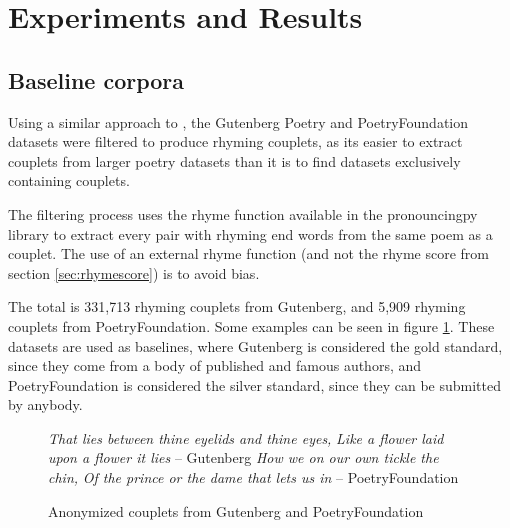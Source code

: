 \documentclass[11pt,a4paper]{article}
\begin{document}
\section{Experiments and Results}
\label{sec:results}

\subsection{Baseline corpora}
\label{sec:corpora}

Using a similar approach to \citet{cole}, the Gutenberg Poetry \cite{gutenbergpoetry} and PoetryFoundation \cite{poetryfoundationkaggle} datasets were filtered to produce rhyming couplets, as its easier to extract couplets from larger poetry datasets than it is to find datasets exclusively containing couplets.

The filtering process uses the rhyme function available in the pronouncingpy library to extract every pair with rhyming end words from the same poem as a couplet. The use of an external rhyme function (and not the rhyme score from section \ref{sec:rhymescore}) is to avoid bias.

The total is 331,713 rhyming couplets from Gutenberg, and 5,909 rhyming couplets from PoetryFoundation. Some examples can be seen in figure \ref{fig:couplet_examples}. These datasets are used as baselines, where Gutenberg is considered the gold standard, since they come from a body of published and famous authors, and PoetryFoundation is considered the silver standard, since they can be submitted by anybody.

\begin{figure}
	\textit{That lies between thine eyelids and thine eyes,} \newline
	\textit{Like a flower laid upon a flower it lies} \newline
	-- Gutenberg
	\vspace{0.5em}
	\newline
	\textit{How we on our own tickle the chin,} \newline
	\textit{Of the prince or the dame that lets us in} \newline
	-- PoetryFoundation
\caption{Anonymized couplets from Gutenberg and PoetryFoundation}
\label{fig:couplet_examples}
\end{figure}
\end{document}
